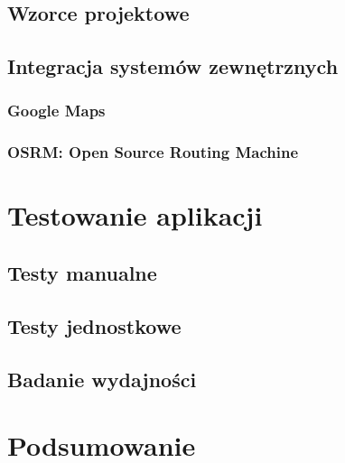 \documentclass[12pt,twoside,openright]{report}
\begin{document}
		\section{Wzorce projektowe}
			
		\section{Integracja systemów zewnętrznych}
			
			\subsection{Google Maps}
				
			\subsection{OSRM: Open Source Routing Machine}
				
	\chapter{Testowanie aplikacji}
	\section{Testy manualne}
		
	\section{Testy jednostkowe}
		\label{sec:testy_jednostkowe}
		
	\section{Badanie wydajności}\label{sec:wydajnosc}
		
	\chapter*{Podsumowanie}
		
	
	
\end{document}
